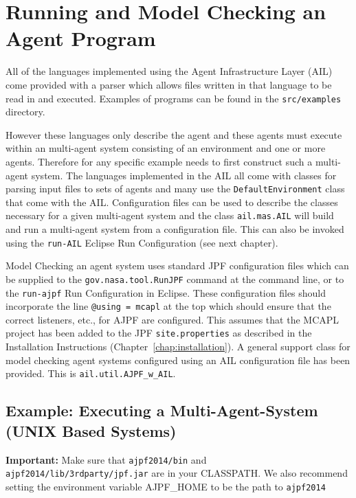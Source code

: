 \chapter{Running and Model Checking an Agent Program}
\label{chap:running}

All of the languages implemented using the Agent Infrastructure Layer (AIL) come provided with a parser which allows files written in that language to be read in and executed.  Examples of programs can be found in the \texttt{src/examples} directory.

However these languages only describe the agent and these agents must execute within an multi-agent system consisting of an environment and one or more agents.  Therefore for any specific example needs to first construct such a multi-agent system.  The languages implemented in the AIL all come with classes for parsing input files to sets of agents and many use the \texttt{DefaultEnvironment} class that come with the AIL. Configuration files can be used to describe the classes necessary  for a given multi-agent system and the class \texttt{ail.mas.AIL} will build and run a multi-agent system from a configuration file.  This can also be invoked using the \texttt{run-AIL} Eclipse Run Configuration (see next chapter).

Model Checking an agent system uses standard JPF configuration files which can be supplied to the \texttt{gov.nasa.tool.RunJPF} command at the command line, or to the \texttt{run-ajpf} Run Configuration in Eclipse.  These configuration files should incorporate the line \texttt{@using = mcapl} at the top which should ensure that the correct listeners, etc., for AJPF are configured.  This assumes that the MCAPL project has been added to the JPF \texttt{site.properties} as described in the Installation Instructions (Chapter~\ref{chap:installation}).  A general support class for model checking agent systems configured using an AIL configuration file has been provided.  This is \texttt{ail.util.AJPF\_w\_AIL}. 

\section{Example: Executing a Multi-Agent-System (UNIX Based Systems)}
{\bf Important:} Make sure that \texttt{ajpf2014/bin} and \texttt{ajpf2014/lib/3rdparty/jpf.jar} are in your CLASSPATH.  We also recommend setting the environment variable AJPF\_HOME to be the path to \texttt{ajpf2014}

